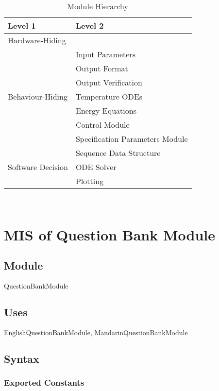 \documentclass[12pt, titlepage]{article}
\begin{document}
\begin{table}[h!]
\centering
\begin{tabular}{p{} p{}}
\toprule
\textbf{Level 1} & \textbf{Level 2}\\
\midrule

{Hardware-Hiding} & ~ \\
\midrule

\multirow{7}{0.3\textwidth}{Behaviour-Hiding} & Input Parameters\\
& Output Format\\
& Output Verification\\
& Temperature ODEs\\
& Energy Equations\\ 
& Control Module\\
& Specification Parameters Module\\
\midrule

\multirow{3}{0.3\textwidth}{Software Decision} & {Sequence Data Structure}\\
& ODE Solver\\
& Plotting\\
\bottomrule

\end{tabular}
\caption{Module Hierarchy}
\label{TblMH}
\end{table}

\newpage
~\newpage

\section{MIS of Question Bank Module} \label{QuestionBankModule}

\subsection{Module}

QuestionBankModule

\subsection{Uses}

EnglishQuestionBankModule, MandarinQuestionBankModule

\subsection{Syntax}

\subsubsection{Exported Constants}
\end{document}
